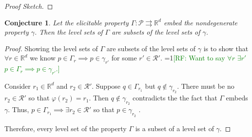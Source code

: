 \documentclass[12pt]{article}
\newcommand{\Comments}{1}
\newcommand{\mynote}[2]{\ifnum\Comments=1\textcolor{#1}{#2}\fi}
\newcommand{\raf}[1]{\mynote{green}{[RF: #1]}}
\newcommand{\reals}{\mathbb{R}}
\renewcommand{\P}{\mathcal{P}}
\newcommand{\R}{\mathcal{R}}
\newcommand{\inter}[1]{\mathring{#1}}%
\newcommand{\toto}{\rightrightarrows}
\newcommand{\trim}{\mathrm{trim}}
\newcommand{\strip}{\mathrm{strip}}
\newtheorem{conjecture}{Conjecture}
\begin{document}
\begin{proof}[Proof Sketch]
%		
%		
	
\end{proof}


\begin{conjecture}\label{conj:lev-sets-subsets}
	Let the elicitable property $\Gamma: \P \toto \reals^d$ embed the nondegenerate property $\gamma$.
	Then the level sets of $\Gamma$ are subsets of the level sets of $\gamma$.
\end{conjecture}

\begin{proof}
	Showing the level sets of $\Gamma$ are subsets of the level sets of $\gamma$ is to show that $\forall r \in \reals^d$ we know $p \in \Gamma_r \implies p \in \gamma_{r'}$ for some $r' \in \R'$.
    \raf{Want to say $\forall r$ $\exists r'$ $p \in \Gamma_r \implies p \in \gamma_{r'}$.}
    
	Consider $r_1 \in \reals^d$ and $r_2 \in \R'$.
	Suppose $q \in \Gamma_{r_1}$ but $q \not \in \gamma_{r_2}$.
	There must be no $r_2 \in \R'$ so that $\varphi(r_2) = r_1$.
	Then $q \not \in \gamma_{r_2}$ contradicts the the fact that $\Gamma$ embeds $\gamma$.
	Thus, $p \in \Gamma_{r_1} \implies \exists r_2 \in \R'$ so that $p \in \gamma_{r_2}$ .
	
	Therefore, every level set of the property $\Gamma$ is a subset of a level set of $\gamma$.
\end{proof}
\end{document}
